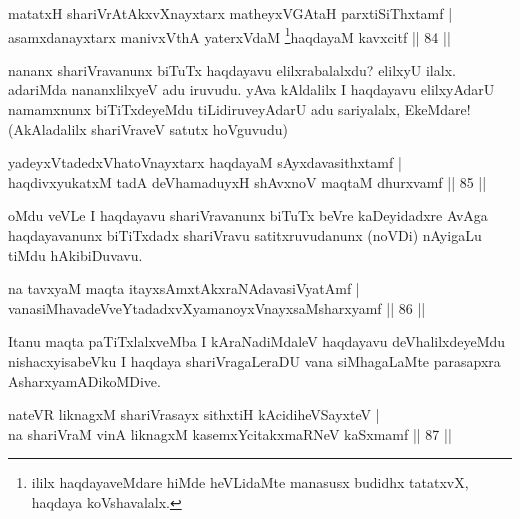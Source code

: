 

\begin{shl}
matatxH shariVrAtAkxvXnayxtarx matheyxVGAtaH parxtiSiThxtamf |\\
asamxdanayxtarx manivxVthA yaterxVdaM \footnote{ililx haqdayaveMdare hiMde heVLidaMte manasusx budidhx tatatxvX, haqdaya koVshavalalx.}haqdayaM kavxcitf \hfill || 84 ||
\end{shl}

\begin{artha}
nananx shariVravanunx biTuTx haqdayavu elilxrabalalxdu? elilxyU ilalx. adariMda nananxlilxyeV adu iruvudu. yAva kAldalilx I haqdayavu elilxyAdarU namamxnunx biTiTxdeyeMdu tiLidiruveyAdarU adu sariyalalx, EkeMdare! (AkAladalilx shariVraveV satutx hoVguvudu)
\end{artha}


\begin{shl}
yadeyxVtadedxVhatoV\s nayxtarx haqdayaM sAyxdavasithxtamf |\\
haqdivxyukatxM tadA deVhamaduyxH shAvxnoV maqtaM dhurxvamf \hfill || 85 ||
\end{shl}

\begin{artha}
oMdu veVLe I haqdayavu shariVravanunx biTuTx beVre kaDeyidadxre AvAga haqdayavanunx biTiTxdadx shariVravu satitxruvudanunx (noVDi) nAyigaLu tiMdu hAkibiDuvavu.
\end{artha}


\begin{shl}
na tavxyaM maqta itayxsAmxtAkxraNAdavasiVyatAmf |\\
vanasiMhavadeVveYtadadxvXyamanoyxVnayxsaMsharxyamf \hfill || 86 ||
\end{shl}

\begin{artha}%
Itanu maqta paTiTxlalxveMba I kAraNadiMdaleV haqdayavu deVhalilxdeyeMdu nishacxyisabeVku I haqdaya shariVragaLeraDU vana siMhagaLaMte parasapxra AsharxyamADikoMDive.
\end{artha}


\begin{shl}
nateVR liknagxM shariVrasayx sithxtiH kAcidiheVSayxteV |\\
na shariVraM vinA liknagxM kasemxYcitakxmaRNeV kaSxmamf \hfill || 87 ||
\end{shl}

